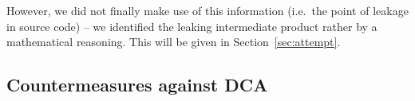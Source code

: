 However, we did not finally make use of this information (i.e.\ the point of leakage in source code) -- we identified the leaking intermediate product rather by a mathematical reasoning. This will be given in Section~\ref{sec:attempt}.




\subsection{Countermeasures against DCA}

